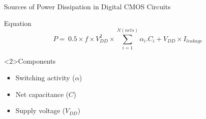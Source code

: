 
\begin{frame}{Sources of Power Dissipation in Digital CMOS Circuits}

\begin{block}{Equation}
\begin{equation} P=\ 0.5 \times f \times V_{DD}^{2} \times \sum_{i=1}^{N(nets)} \alpha_{i} . C_{i} + V_{DD} \times I_{leakage}\end{equation}
\end{block}

\begin{block}<2>{Components}
\begin{itemize}
\item Switching activity ($\alpha$)
\item Net capacitance ($C$)
\item Supply voltage  ($V_{DD}$)
\end{itemize}
\end{block}
\end{frame}
